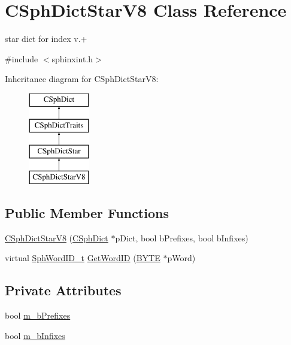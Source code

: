 \hypertarget{classCSphDictStarV8}{\section{C\-Sph\-Dict\-Star\-V8 Class Reference}
\label{classCSphDictStarV8}
}


star dict for index v.+  




{\ttfamily \#include $<$sphinxint.\-h$>$}

Inheritance diagram for C\-Sph\-Dict\-Star\-V8\-:\begin{figure}[H]
\begin{center}
\leavevmode
\includegraphics[height=4.000000cm]{classCSphDictStarV8}
\end{center}
\end{figure}
\subsection*{Public Member Functions}
\begin{DoxyCompactItemize}
\item 
\hyperlink{classCSphDictStarV8_adfa43ad86c8cb25004669d1d34e33bf0}{C\-Sph\-Dict\-Star\-V8} (\hyperlink{classCSphDict}{C\-Sph\-Dict} $\ast$p\-Dict, bool b\-Prefixes, bool b\-Infixes)
\item 
virtual \hyperlink{sphinx_8h_a80a94d5984fdf9214a98f3e5e65df963}{Sph\-Word\-I\-D\-\_\-t} \hyperlink{classCSphDictStarV8_a643a9893a9c825a807ba0892ccf52fd8}{Get\-Word\-I\-D} (\hyperlink{sphinxstd_8h_a4ae1dab0fb4b072a66584546209e7d58}{B\-Y\-T\-E} $\ast$p\-Word)
\end{DoxyCompactItemize}
\subsection*{Private Attributes}
\begin{DoxyCompactItemize}
\item 
bool \hyperlink{classCSphDictStarV8_ae01b72441144a8cf1b7fcc4a67369d92}{m\-\_\-b\-Prefixes}
\item 
bool \hyperlink{classCSphDictStarV8_af69c0f5ab8655132b79d6bcd0a7a79bd}{m\-\_\-b\-Infixes}
\end{DoxyCompactItemize}
